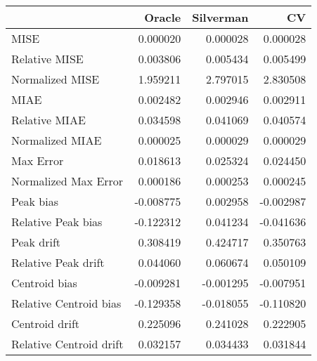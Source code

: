 \begin{tabular}{lrrr}
  \hline
 & Oracle & Silverman & CV \\ 
  \hline
MISE & 0.000020 & 0.000028 & 0.000028 \\ 
  Relative MISE & 0.003806 & 0.005434 & 0.005499 \\ 
  Normalized MISE & 1.959211 & 2.797015 & 2.830508 \\ 
  MIAE & 0.002482 & 0.002946 & 0.002911 \\ 
  Relative MIAE & 0.034598 & 0.041069 & 0.040574 \\ 
  Normalized MIAE & 0.000025 & 0.000029 & 0.000029 \\ 
  Max Error & 0.018613 & 0.025324 & 0.024450 \\ 
  Normalized Max Error & 0.000186 & 0.000253 & 0.000245 \\ 
  Peak bias & -0.008775 & 0.002958 & -0.002987 \\ 
  Relative Peak bias & -0.122312 & 0.041234 & -0.041636 \\ 
  Peak drift & 0.308419 & 0.424717 & 0.350763 \\ 
  Relative Peak drift & 0.044060 & 0.060674 & 0.050109 \\ 
  Centroid bias & -0.009281 & -0.001295 & -0.007951 \\ 
  Relative Centroid bias & -0.129358 & -0.018055 & -0.110820 \\ 
  Centroid drift & 0.225096 & 0.241028 & 0.222905 \\ 
  Relative Centroid drift & 0.032157 & 0.034433 & 0.031844 \\ 
   \hline
\end{tabular}
